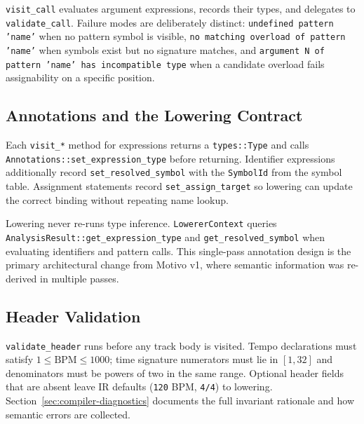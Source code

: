 \texttt{visit\_call} evaluates argument expressions, records their types, and delegates to \texttt{validate\_call}.
Failure modes are deliberately distinct: \texttt{undefined pattern 'name'} when no pattern symbol is visible,
\texttt{no matching overload of pattern 'name'} when symbols exist but no signature matches, and
\texttt{argument N of pattern 'name' has incompatible type} when a candidate overload fails assignability on a specific
position.

\subsection{Annotations and the Lowering Contract}\label{detail-subsec:semantic-annotations}

Each \texttt{visit\_*} method for expressions returns a \texttt{types::Type} and calls
\texttt{Annotations::set\_expression\_type} before returning.
Identifier expressions additionally record \texttt{set\_resolved\_symbol} with the \texttt{SymbolId} from the symbol
table.
Assignment statements record \texttt{set\_assign\_target} so lowering can update the correct binding without repeating
name lookup.

Lowering never re-runs type inference.
\texttt{LowererContext} queries \texttt{AnalysisResult::get\_expression\_type} and
\texttt{get\_resolved\_symbol} when evaluating identifiers and pattern calls.
This single-pass annotation design is the primary architectural change from Motivo v1, where semantic information was
re-derived in multiple passes.

\subsection{Header Validation}\label{detail-subsec:semantic-header-validation}

\texttt{validate\_header} runs before any track body is visited.
Tempo declarations must satisfy $1 \leq \mathrm{BPM} \leq 1000$; time signature numerators must lie in $[1, 32]$ and
denominators must be powers of two in the same range.
Optional header fields that are absent leave IR defaults (\texttt{120} BPM, \texttt{4/4}) to lowering.
Section~\ref{sec:compiler-diagnostics} documents the full invariant rationale and how semantic errors are collected.

